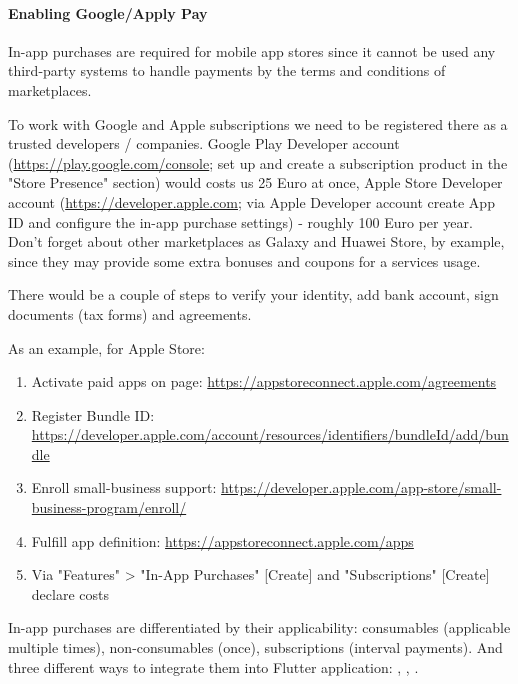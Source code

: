 \paragraph{Enabling Google/Apply Pay}

In-app purchases are required for mobile app stores since it cannot be used any third-party systems to handle payments
by the terms and conditions of marketplaces.

To work with Google and Apple subscriptions we need to be registered there as a trusted developers / companies. Google 
Play Developer account (\href{https://play.google.com/console}{https://play.google.com/console}; set up and create a 
subscription product in the "Store Presence" section) would costs us 25 Euro at once, Apple Store Developer 
account (\href{https://developer.apple.com}{https://developer.apple.com}; via Apple Developer account create App ID and 
configure the in-app purchase settings) - roughly 100 Euro per year. Don't forget about other marketplaces as 
Galaxy and Huawei Store, by example, since they may provide some extra bonuses and coupons for a services usage.

There would be a couple of steps to verify your identity, add bank account, sign documents (tax forms) and agreements.

As an example, for Apple Store:
\begin{enumerate}
  \item Activate paid apps on page: \href{https://appstoreconnect.apple.com/agreements}{https://appstoreconnect.apple.com/agreements}
  \item Register Bundle ID: \href{https://developer.apple.com/account/resources/identifiers/bundleId/add/bundle}{https://developer.apple.com/account/resources/identifiers/bundleId/add/bundle}
  \item Enroll small-business support: \href{https://developer.apple.com/app-store/small-business-program/enroll/}{https://developer.apple.com/app-store/small-business-program/enroll/}
  \item Fulfill app definition: \href{https://appstoreconnect.apple.com/apps}{https://appstoreconnect.apple.com/apps}
  \item Via "Features" > "In-App Purchases" [Create] and "Subscriptions" [Create] declare costs
\end{enumerate}

In-app purchases are differentiated by their applicability: consumables (applicable multiple times), non-consumables 
(once), subscriptions (interval payments). And three different ways to integrate them into Flutter application:
, , .
